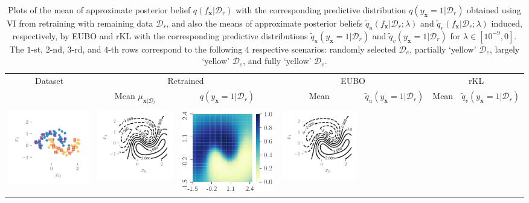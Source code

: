 \documentclass{article}
\theoremstyle{definition}
\newcommand{\mbf}[1]{\mathbf{#1}}
\newcommand{\mcl}[1]{\mathcal{#1}}
\newcommand{\dc}{\mcl{D}_r}
\newcommand{\dr}{\mcl{D}_e}
\newcommand{\eubo}{\tilde{q}_u}
\newcommand{\elbo}{\tilde{q}_v}
\begin{document}
\begin{table}
\caption{Plots of the mean %
of %
approximate posterior belief $q(f_{\mbf{x}}|\dc)$ with the corresponding predictive distribution 
$q(y_{\mbf{x}}=1|\dc)$ obtained using VI from retraining with remaining data $\dc$, and also the means of approximate posterior beliefs
$\eubo(f_{\mbf{x}}|\dc;\lambda)$ and $\elbo(f_{\mbf{x}}|\dc;\lambda)$ induced, respectively, by EUBO and rKL with the corresponding
predictive distributions
$\eubo(y_{\mbf{x}}=1|\dc)$ and $\elbo(y_{\mbf{x}}=1|\dc)$ for $\lambda \in [10^{-9}, 0]$.
The $1$-st, $2$-nd, $3$-rd, and $4$-th rows correspond to the following $4$ respective scenarios: randomly selected $\dr$, partially `yellow' $\dr$, largely `yellow' $\dr$, and fully `yellow' $\dr$.}
\begin{tabular}{@{}c@{}c@{}c@{}c@{}c@{}c@{}c@{}}
\toprule
\multirow[t]{2}{*}{Dataset}
&
\multicolumn{2}{c}{Retrained}
&
\multicolumn{2}{c}{EUBO}
&
\multicolumn{2}{c}{rKL}
\\
\cmidrule(l){2-3} \cmidrule(l){4-5} \cmidrule(l){6-7}
&
Mean $\mu_{\mbf{x}|\dc}$
&
$q(y_{\mbf{x}}=1|\dc)$
&
Mean
&
$\eubo(y_{\mbf{x}}=1|\dc)$
&
Mean
&
$\elbo(y_{\mbf{x}}=1|\dc)$
\\
\midrule
\\
\multirow[t]{4}{*}{
    \includegraphics[trim={0mm 0mm 3mm 3mm}, clip,height=0.13\textwidth]{img/moon/moon_random_data.pdf}
}
&
\multirow[t]{4}{*}{
    \includegraphics[trim={7mm 8mm 3mm 3mm}, clip,height=0.13\textwidth]{img/moon/moon_random_remain_meanf.pdf}
}
&
\multirow[t]{4}{*}{
    \includegraphics[height=0.13\textwidth]{img/moon/moon_random_remain_prob.pdf}
}
&
\includegraphics[trim={7mm 8mm 3mm 3mm}, clip,height=0.13\textwidth]{img/moon/moon_random_eubo_meanf_1e-09.pdf}

\end{tabular}
\end{table}
\end{document}
